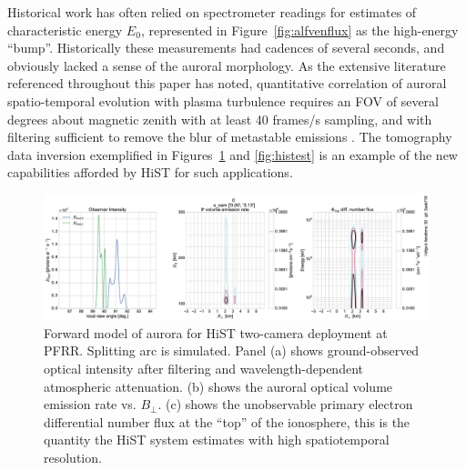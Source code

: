 Historical work has often relied on spectrometer readings for estimates of characteristic energy $E_0$, represented in Figure~\ref{fig:alfvenflux} as the high-energy ``bump''.
Historically these measurements had cadences of several seconds, and obviously lacked a sense of the auroral morphology.
As the extensive literature referenced throughout this paper has noted, quantitative correlation of auroral spatio-temporal evolution with plasma turbulence requires an FOV of several degrees about magnetic zenith with at least 40 frames/s sampling, and with filtering sufficient to remove the blur of metastable emissions \citep{hirsch2016}.
The tomography data inversion exemplified in Figures~\ref{fig:histfwd} and \ref{fig:histest} is an example of the new capabilities afforded by HiST for such applications.
\begin{figure}\centering
    \includegraphics[width=0.9\columnwidth]{gfx/fwd0}
    \caption{Forward model of aurora for HiST two-camera deployment at PFRR. Splitting arc is simulated. 
    	Panel (a) shows ground-observed optical intensity after filtering and wavelength-dependent atmospheric attenuation. 
    	(b) shows the auroral optical volume emission rate vs. $B_\perp$. 
    	(c) shows the unobservable primary electron differential number flux at the ``top'' of the ionosphere, this is the quantity the HiST system estimates with high spatiotemporal resolution.}\label{fig:histfwd}
\end{figure}

